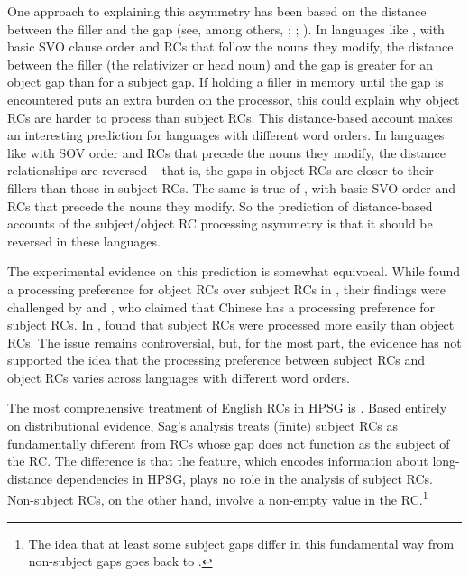 \documentclass[output=paper
                ,modfonts
                ,nonflat
	        ,collection
	        ,collectionchapter
	        ,collectiontoclongg
 	        ,biblatex
                ,babelshorthands
                ,newtxmath
                ,draftmode
                ,colorlinks, citecolor=brown
]{./langsci/langscibook}
\begin{document}
One approach to explaining this asymmetry has been based on the distance between the filler and the gap (see, among others, \citealt{WannerMaratsos78}; \citealt{Gibson98a}; \citealt{Hawkins2004a-u}).  In languages like , with basic SVO clause order and RCs that follow the nouns they modify, the distance between the filler (the relativizer or head noun) and the gap is greater for an object gap than for a subject gap.  If holding a filler in memory until the gap is encountered puts an extra burden on the processor, this could explain why object RCs are harder to process than subject RCs.   This distance-based account makes an interesting prediction for languages with different word orders.  In languages like  with SOV order and RCs that precede the nouns they modify, the distance relationships are reversed -- that is, the gaps in object RCs are closer to their fillers than those in subject RCs.  The same is true of , with basic SVO order and RCs that precede the nouns they modify.  So the prediction of distance-based accounts of the subject/object RC processing asymmetry is that it should be reversed in these languages.

The experimental evidence on this prediction is somewhat equivocal.  While \citet{HsiaoGibson03} found a processing preference for object RCs over subject RCs in , their findings were challenged by \citet{LinBever2006} and \citet{VasishthEtal2013}, who claimed that Chinese has a processing preference for subject RCs.  In , \citet{MiyamotoNakamura2003} found that subject RCs were processed more easily than object RCs.  The issue remains controversial, but, for the most part, the evidence has not supported the idea that the processing preference between subject RCs and object RCs varies across languages with different word orders.

The most comprehensive treatment of English RCs in HPSG is \citet{Sag97a}. Based entirely on distributional evidence, Sag's analysis treats (finite) subject RCs as fundamentally different from RCs whose gap does not function as the subject of the RC.  The difference is that the \isi{\slasch} feature, which encodes information about long-distance dependencies in HPSG, plays no role in the analysis of subject RCs.  Non-subject RCs, on the other hand, involve a non-empty \slasch value in the RC.\footnote{The idea that at least some subject gaps differ in this fundamental way from non-subject gaps goes back to \citet{Gazdar81a}.}   
\end{document}
